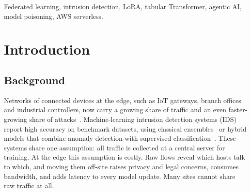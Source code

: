 \documentclass[conference]{IEEEtran}
\begin{document}
\begin{abstract}
Network intrusion detection at the edge must adapt to attacks that only some
sites have seen, keep raw traffic on the device, and avoid letting one bad
model update or one false alarm disrupt legitimate hosts. We present Agentic
FedGrid, a system in which autonomous agents on edge nodes detect, respond
to, and learn from network flows. A frozen tabular Transformer is adapted
through low-rank (LoRA) adapters federated over a serverless AWS control
plane, at 10.3\,KB per upload instead of 103.7\,KB for the full model. Each
agent chooses actions by expected cost, escalates blocks gradually with
automatic expiry, learns from analyst rollbacks, shares and retracts threat
intelligence with its peers, and adopts a new global model only if it does
not degrade its own held-out performance. Experiments ran on four AWS EC2
nodes with UNSW-NB15 and ToN\_IoT over multiple seeds. Federation raises
recall on an attack class withheld from pretraining from 41.1\% to 54.5\%,
but moving only the frozen model's threshold to the same false-positive rate
gives 53.4\%, and the class AUROC does not improve (0.823 vs.\ 0.818). This
holds even with the class spread over three clients or with five times longer
local training, so default-threshold recall overstates federated gains. Under
a model-replacement attack, FedAvg collapses to 47.5\% accuracy, while median
aggregation holds 86.5\% and the adoption gate rejects every poisoned model.
The full agent cuts benign traffic dropped by blocking from 49.8\% to 12.5\%
on ToN\_IoT and from 22.1\% to 2.1\% on UNSW-NB15, while letting fewer
attacks through. The backbone reaches 87.7\% accuracy on the official
UNSW-NB15 test set and 99.3\% on ToN\_IoT, with 1.7\,ms inference per flow.
\end{abstract}

\begin{IEEEkeywords}
Federated learning, intrusion detection, LoRA, tabular Transformer, agentic
AI, model poisoning, AWS serverless.
\end{IEEEkeywords}

\section{Introduction}

\subsection{Background}
Networks of connected devices at the edge, such as IoT gateways, branch
offices and industrial controllers, now carry a growing share of traffic and
an even faster-growing share of attacks~\cite{iot_survey}. Machine-learning
intrusion detection systems (IDS) report high accuracy on benchmark datasets,
using classical ensembles~\cite{pandit2023} or hybrid models that combine
anomaly detection with supervised classification~\cite{bayesh2024}. These
systems share one assumption: all traffic is collected at a central server
for training. At the edge this assumption is costly. Raw flows reveal which
hosts talk to which, and moving them off-site raises privacy and legal
concerns, consumes bandwidth, and adds latency to every model update. Many
sites cannot share raw traffic at all.
\end{document}
